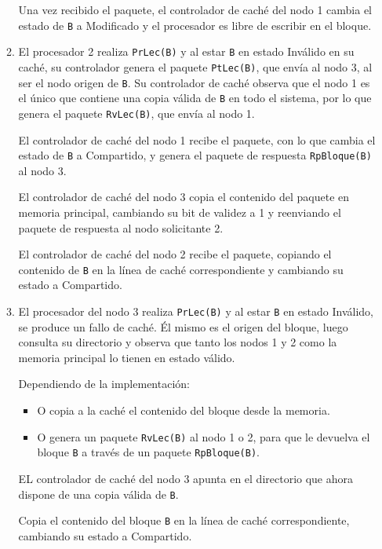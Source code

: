 \begin{ejercicio}
\begin{enumerate}
\begin{enumerate}
            Una vez recibido el paquete, el controlador de caché del nodo 1 cambia el estado de \verb|B| a Modificado y el procesador es libre de escribir en el bloque.

        \item El procesador 2 realiza \verb|PrLec(B)| y al estar \verb|B| en estado Inválido en su caché, su controlador genera el paquete \verb|PtLec(B)|, que envía al nodo 3, al ser el nodo origen de \verb|B|. Su controlador de caché observa que el nodo 1 es el único que contiene una copia válida de \verb|B| en todo el sistema, por lo que genera el paquete \verb|RvLec(B)|, que envía al nodo 1.

            El controlador de caché del nodo 1 recibe el paquete, con lo que cambia el estado de \verb|B| a Compartido, y genera el paquete de respuesta \verb|RpBloque(B)| al nodo 3.

            El controlador de caché del nodo 3 copia el contenido del paquete en memoria principal, cambiando su bit de validez a 1 y reenviando el paquete de respuesta al nodo solicitante 2.

            El controlador de caché del nodo 2 recibe el paquete, copiando el contenido de \verb|B| en la línea de caché correspondiente y cambiando su estado a Compartido.
        
        \item El procesador del nodo 3 realiza \verb|PrLec(B)| y al estar \verb|B| en estado Inválido, se produce un fallo de caché. Él mismo es el origen del bloque, luego consulta su directorio y observa que tanto los nodos 1 y 2 como la memoria principal lo tienen en estado válido.

            Dependiendo de la implementación:
            \begin{itemize}
                \item O copia a la caché el contenido del bloque desde la memoria.
                \item O genera un paquete \verb|RvLec(B)| al nodo 1 o 2, para que le devuelva el bloque \verb|B| a través de un paquete \verb|RpBloque(B)|.
            \end{itemize}
            EL controlador de caché del nodo 3 apunta en el directorio que ahora dispone de una copia válida de \verb|B|.

            Copia el contenido del bloque \verb|B| en la línea de caché correspondiente, cambiando su estado a Compartido.
        

\end{enumerate}
\end{enumerate}
\end{ejercicio}

